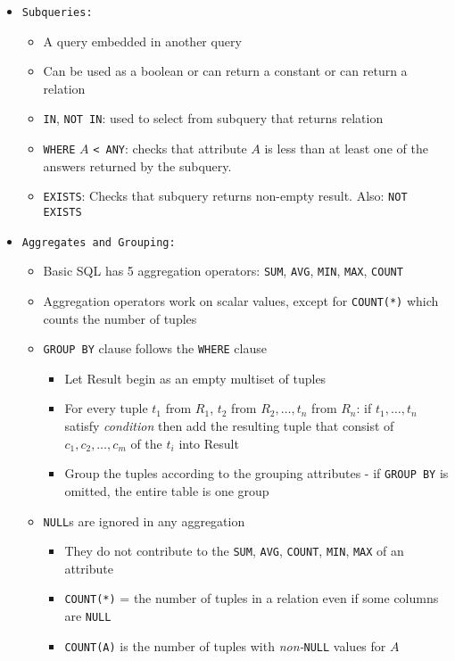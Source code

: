 \documentclass[landscape,8pt]{extarticle}
\newcommand{\code}{\lstinline}
\begin{document}
\begin{multicols}{4}
\begin{itemize}
    \item \code{Subqueries:}
    \begin{itemize}
        \item A query embedded in another query
        \item Can be used as a boolean or can return a constant or can return a relation
        \item \code{IN}, \code{NOT IN}: used to select from subquery that returns relation
        \item \code{WHERE} $A$ \code{< ANY}: checks that attribute $A$ is less than at least one of
        the answers returned by the subquery.
        \item \code{EXISTS}: Checks that subquery returns non-empty result. Also: \code{NOT EXISTS}
    \end{itemize}
    \item \code{Aggregates and Grouping:}
    \begin{itemize}
    \item Basic SQL has 5 aggregation operators: \code{SUM}, \code{AVG}, \code{MIN}, \code{MAX}, \code{COUNT}
    \item Aggregation operators work on scalar values, except for \code{COUNT(*)} which counts the
    number of tuples
    \item \code{GROUP BY} clause follows the \code{WHERE} clause
    \begin{itemize}
        \item Let Result begin as an empty multiset of tuples
        \item For every tuple $t_1$ from $R_1$, $t_2$ from $R_2, \ldots, t_n$ from $R_n$: if $t_1,
        \ldots, t_n$ satisfy \emph{condition} then add the resulting tuple that consist of $c_1,
        c_2, \ldots, c_m$ of the $t_i$ into Result
        \item Group the tuples according to the grouping attributes - if \code{GROUP BY} is omitted,
        the entire table is one group
    \end{itemize}
    \item \code{NULL}s are ignored in any aggregation
    \begin{itemize}
        \item They do not contribute to the \code{SUM}, \code{AVG}, \code{COUNT}, \code{MIN},
        \code{MAX} of an attribute
        \item \code{COUNT(*)} = the number of tuples in a relation even if some columns are \code{NULL}
        \item \code{COUNT(A)} is the number of tuples with \emph{non-}\code{NULL} values for $A$

\end{itemize}
\end{itemize}
\end{itemize}
\end{multicols}
\end{document}
